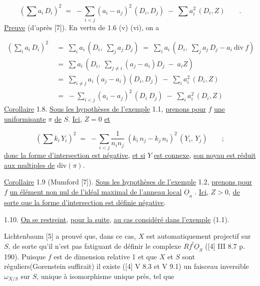 \begin{equation*}
(\sum a_i\, D_i)^2 \;=\; -\sum_{i<j} (a_i - a_j)^2\, (D_i, D_j) \;-\; \sum a_i^2\, (D_i, Z) \qquad .
\end{equation*}
\underline{Preuve} (d'après [7]). En vertu de 1.6 (v) (vi), on a

\begin{equation*}
\begin{aligned}
(\sum_i a_i\, D_i)^2 \;&=\; \sum_i a_i\, (D_i,\; \sum_j a_j\, D_j) \;=\; \sum_i a_i\, (D_i,\; \sum_j a_j\, D_j - a_i\ \mathrm{div}\ f) \\[2pt]
&=\; \sum a_i\, (D_i,\; \sum_{j \neq i} (a_j - a_i) D_j \;-\; a_i Z) \\[2pt]
&=\; \sum_{i \neq j} a_i\, (a_j - a_i)(D_i, D_j) \;-\; \sum_i a_i^2\, (D_i, Z) \\[2pt]
&=\; -\sum_{i<j} (a_i - a_j)^2\, (D_i\ D_j) \;-\; \sum_i a_i^2\, (D_i, Z)
\end{aligned}
\end{equation*}
\underline{Corollaire} 1.8. \underline{Sous les hypothèses de l'exemple} 1.1, \underline{prenons pour} $f$ \underline{une uniformisante} $\pi$ \underline{de} $S$. \underline{Ici}, $Z = 0$ \underline{et}

\begin{equation*}
(\sum k_i\, Y_i)^2 \;=\; -\sum_{i<j} \frac{1}{n_i n_j}\; (k_i\, n_j - k_j\, n_i)^2\, (Y_i,\, Y_j) \qquad ;
\end{equation*}
\underline{donc la forme d'intersection est négative}, \underline{et si} $Y$ \underline{est connexe}, \underline{son noyau est réduit aux multiples de} $\mathrm{div}(\pi)$.

\underline{Corollaire} 1.9 (Mumford [7]). \underline{Sous les hypothèses de l'exemple} 1.2, \underline{prenons pour} $f$ \underline{un élément non nul de l'idéal maximal de l'anneau local} $\underline{O}_a$ . \underline{Ici}, $Z > 0$, \underline{de sorte que la forme d'intersection est définie négative}.



1.10. \underline{On se restreint}, \underline{pour la suite}, \underline{au cas considéré dans l'exemple} (1.1).

Lichtenbaum [5] a prouvé que, dans ce cas, $X$ est automatiquement projectif sur $S$, de sorte qu'il n'est pas fatiguant de définir le complexe $Rf^{!}\underline{O}_S$ ([4] III 8.7 p. 190). Puisque $f$ est de dimension relative 1 et que $X$ et $S$ sont réguliers(Gorenstein suffirait) il existe ([4] V 8.3 et V 9.1) un faisceau inversible $\omega_{X/S}$ sur $S$, unique à isomorphisme unique près, tel que

